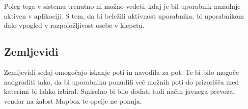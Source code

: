 \documentclass[a4paper,12pt,openright]{book}
\begin{document}
Poleg tega v sistemu trenutno ni možno vedeti, kdaj je bil uporabnik nazadnje aktiven v aplikaciji.
S tem, da bi beležili aktivnost uporabnika, bi uporabnikom dalo vpogled v razpoložljivost osebe v klepetu.

\subsection{Zemljevidi}
Zemljevidi sedaj omogočajo iskanje poti in navodila za pot.
Te bi bilo mogoče nadgraditi tako, da bi uporabniku ponudili več možnih poti do prizorišča med katerimi bi lahko izbiral.
Smiselno bi bilo dodati tudi način javnega prevoza, vendar na žalost Mapbox te opcije ne ponuja.


\raggedright

\printbibliography[heading=bibintoc,type=article,title={Članki v revijah}]

\printbibliography[heading=bibintoc,type=inproceedings,title={Članki v zbornikih}]

\printbibliography[heading=bibintoc,type=incollection,title={Poglavja v knjigah}]

\printbibliography[heading=bibintoc,title={Literatura}]
\end{document}
